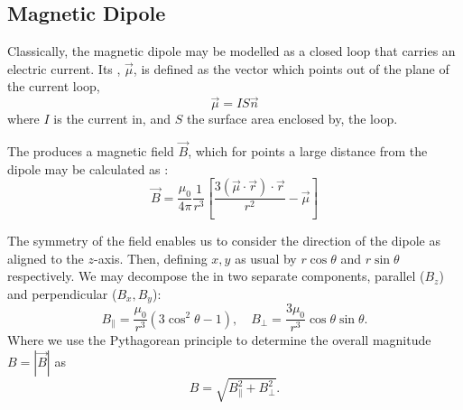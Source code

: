 \subsection{Magnetic Dipole}
Classically, the magnetic dipole may be modelled as a closed loop that carries an
electric current. 
Its , $\vec{\mu}$, is defined as the vector which points out of the plane
of the current loop, 
\begin{equation}
    \vec{\mu} = IS \vec{n}
    \label{eq:dipole_moment}
\end{equation}
where $I$ is the current in, and $S$ the surface area enclosed by, the loop. 

The  produces a magnetic field $\vec{B}$, which for points a large distance from the dipole may be calculated as \cite{}:
$$\vec{B} = \frac{\mu_0}{4\pi} \frac{1}{r^3} \left[\frac{3(\vec{\mu} \cdot \vec{r}) \cdot \vec{r}}{r^2} - \vec{\mu}\right]$$

The symmetry of the field enables us to consider the direction of the dipole as aligned to the $z$-axis. Then, defining $x,y$ as usual by $r \cos\theta$ and $r \sin\theta$ respectively. We may decompose the  in two separate components, parallel ($B_z$) and perpendicular ($B_x, B_y$): 
$$B_\parallel =\frac{\mu_0}{r^3}(3\cos^2 \theta - 1), \quad B_\perp = \frac{3\mu_0}{r^3}\cos\theta\sin\theta.$$
Where we use the Pythagorean principle to determine the overall magnitude $B = |\vec{B}|$ as
$$B = \sqrt{B_\parallel^2 + B_\perp^2}.$$


